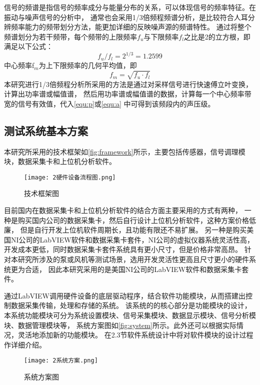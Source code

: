 信号的频谱是指信号的频率成分与能量分布的关系，可以体现信号的频率特征。在振动与噪声信号的分析中，
通常也会采用1/3倍频程频谱分析，是比较符合人耳分辨频率能力的频带划分方法，能更加详细的反映噪声源的频谱特性。
通过将整个频谱划分为若干频带，每个频带的上限频率$f_u$与下限频率$f_l$之比是2的立方根，即满足以下公式：
\begin{equation}
    \label{equ:fu}
    f_{u}/f_{l}=2^{1/3}=1.2599
\end{equation}
中心频率f$_{m}$为上下限频率的几何平均值，即
\begin{equation}
    \label{equ:fm}
    f_{m}=\sqrt{f_{u}\cdot f_{l} } 
\end{equation}
本研究进行1/3倍频程分析所采用的方法是通过对采样信号进行快速傅立叶变换，计算出功率谱或幅值谱，
然后用功率谱或幅值谱的数据，计算每一个中心频率带宽的信号有效值，代入\autoref{equ:p}或\autoref{equ:a}
中可得到该频段内的声压级。
\subsection{测试系统基本方案}
本研究所采用的技术框架如\autoref{fig:framework}所示，主要包括传感器，信号调理模块，数据采集卡和上位机分析软件。
\begin{figure}[htbp]
    \centering
    \texttt{[image: 2硬件设备流程图.png]}
    \caption{\label{fig:framework}技术框架图}
\end{figure}

目前国内在数据采集卡和上位机分析软件的结合方面主要采用的方式有两种，
一种是购买国内公司的数据采集卡，然后自行设计上位机分析软件，这种方案价格低廉，
但是自行开发上位机软件周期长，且功能有限还不易扩展。
另一种是购买美国NI公司的LabVIEW软件和数据采集卡套件，NI公司的虚拟仪器系统灵活性高，
开发成本更低，同时数据采集卡套件系统具有更小尺寸，但是价格非常高昂。
针对本研究所涉及的泵或风机等测试场景，选用开发灵活性更高且尺寸更小的硬件系统更为合适，
因此本研究采用的是美国NI公司的LabVIEW软件和数据采集卡套件。

通过LabVIEW调用硬件设备的底层驱动程序，结合软件功能模块，从而搭建出控制数据采集传输，处理和存储的系统。
该系统的的核心部分是功能模块的设计，本系统功能模块可分为系统设置模块、信号采集模块、数据显示模块、信号分析模块、数据管理模块等，
系统方案图如\autoref{fig:system}所示。此外还可以根据实际情况，灵活地添加新的功能模块。
在2.3节软件系统设计中将对软件模块的设计过程作详细介绍。
\begin{figure}[htbp]
    \centering
    \texttt{[image: 2系统方案.png]}
    \caption{\label{fig:system}系统方案图}
\end{figure}

